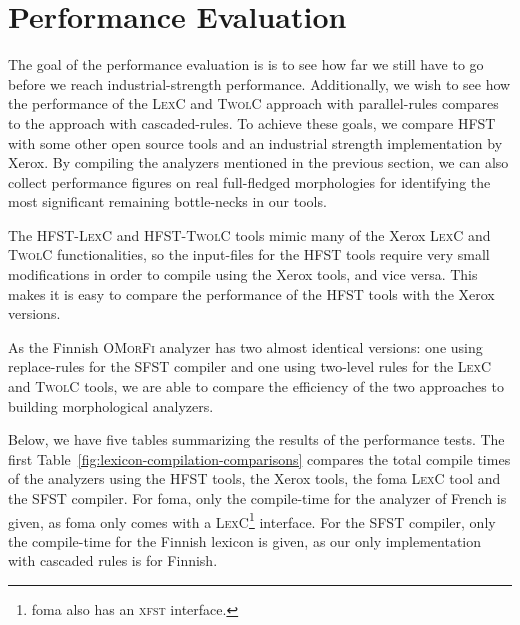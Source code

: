 \documentclass[a4paper]{article}
\begin{document}
\section{Performance Evaluation}
\label{sec:performance}

The goal of the performance evaluation is is to see how far we still
have to go before we reach industrial-strength performance.
Additionally, we wish to see how the performance of the \textsc{LexC}
and \textsc{TwolC} approach with parallel-rules compares to the
approach with cascaded-rules. To achieve these goals, we compare
\textsc{HFST} with some other open source tools and an industrial
strength implementation by Xerox.  By compiling the analyzers
mentioned in the previous section, we can also collect performance
figures on real full-fledged morphologies for identifying the most
significant remaining bottle-necks in our tools.

The \textsc{HFST-LexC} and \textsc{HFST-TwolC} tools mimic many of the
Xerox \textsc{LexC} and \textsc{TwolC} functionalities, so the
input-files for the \textsc{HFST} tools require very small
modifications in order to compile using the Xerox tools, and vice
versa. This makes it is easy to compare the performance of the
\textsc{HFST} tools with the Xerox versions.

As the Finnish \textsc{OMorFi} analyzer has two almost identical
versions: one using replace-rules for the \textsc{SFST} compiler and
one using two-level rules for the \textsc{LexC} and \textsc{TwolC}
tools, we are able to compare the efficiency of the two approaches to
building morphological analyzers.

Below, we have five tables summarizing the results of the performance
tests. The first Table~\ref{fig:lexicon-compilation-comparisons}
compares the total compile times of the analyzers using the
\textsc{HFST} tools, the Xerox tools, the foma \textsc{LexC} tool and
the \textsc{SFST} compiler.  For foma, only the compile-time for the
analyzer of French is given, as foma only comes with a
\textsc{LexC}\footnote{foma also has an \textsc{xfst} interface.}
interface.  For the \textsc{SFST} compiler, only the compile-time for
the Finnish lexicon is given, as our only implementation with cascaded
rules is for Finnish.
\end{document}
